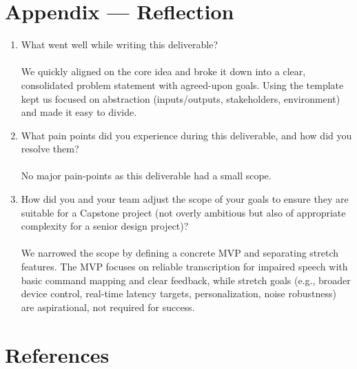 \documentclass{article}
\begin{document}
\newpage{}

\section*{Appendix --- Reflection}


\begin{enumerate}
    \item What went well while writing this deliverable? \\ \\
    We quickly aligned on the core idea and broke it down into a clear, consolidated problem statement with agreed-upon goals. Using the template kept us focused on abstraction (inputs/outputs, stakeholders, environment) and made it easy to divide.
    \item What pain points did you experience during this deliverable, and how
    did you resolve them? \\ \\
    No major pain-points as this deliverable had a small scope.
    \item How did you and your team adjust the scope of your goals to ensure
    they are suitable for a Capstone project (not overly ambitious but also of
    appropriate complexity for a senior design project)? \\ \\
    We narrowed the scope by defining a concrete MVP and separating stretch features. The MVP focuses on reliable transcription for impaired speech with basic command mapping and clear feedback, while stretch goals (e.g., broader device control, real-time latency targets, personalization, noise robustness) are aspirational, not required for success.
\end{enumerate} 

\section*{References}


\end{document}
